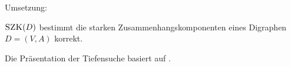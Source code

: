 \begin{bem} Umsetzung: 

\end{bem} 


\begin{thm}
$\mathop{\text{\textsc{SZK}}}(D)$ bestimmt die starken Zusammenhangskomponenten eines Digraphen~$D=(V,A)$ korrekt.
\end{thm}


\begin{bem}
	Die Präsentation der Tiefensuche basiert auf  \cite{CLRS17}.
\end{bem} 